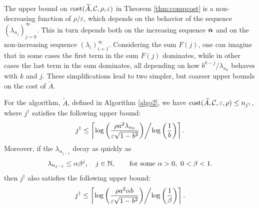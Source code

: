 \documentclass[graybox,footinfo]{svmult}
\begin{document}
The upper bound on $\textup{cost}(\widetilde{A},{\mathcal{C}},\rho,\varepsilon)$ in Theorem \ref{thm:compcost}  is a non-decreasing function of $\rho/\varepsilon$, which depends on the behavior of the sequence $(\lambda_{n_j})_{j=0}^\infty$.  This in turn depends both on the increasing sequence ${\boldsymbol{n}}$ and on the non-increasing sequence $(\lambda_i)_{i=1}^\infty$. Considering the sum $F(j)$,
one can imagine that in some cases the first term in the sum $F(j)$ dominates, while in other cases the last term in the sum dominates, all depending on how $b^{k-j}/\lambda_{n_{k}}$ behaves with $k$ and $j$.  These simplifications lead to two simpler, but coarser upper bounds on the cost of $\widetilde{A}$.

\begin{corollary} For the algorithm, $\widetilde{A}$, defined in Algorithm \ref{algo2}, we have $\textup{cost}(\widetilde{A},{\mathcal{C}},\varepsilon,\rho) \le n_{j^\dagger}$, where $j^\dagger$ satisfies the following upper bound:
\begin{equation} \label{jdaggerfirst}
j^\dagger \le \left \lceil \log\left(\frac{\rho a^2\lambda_{n_{0}} }{\varepsilon \sqrt{1 - b^2}}\right) \middle/ \log\left(\frac{1}{b}\right) \right \rceil.
\end{equation}
Moreover, if the $\lambda_{n_{j-1}}$ decay as quickly as
\begin{equation}
\label{lambdankbd}
\lambda_{n_{j-1}} \le \alpha \beta^j,  \quad j \in \bbN,  \qquad \text{for some } \alpha > 0, \ 0 < \beta < 1.
\end{equation}
then $j^\dagger$ also satisfies the following upper bound:
\begin{equation}
\label{jdaggerlastsimple}
j^\dagger \le
\left \lceil \log\left(\frac{\rho a^2\alpha b }{\varepsilon \sqrt{1 - b^2}}\right) \middle/ \log\left(\frac{1}{\beta}\right) \right \rceil.
\end{equation}
\end{corollary}
\end{document}
